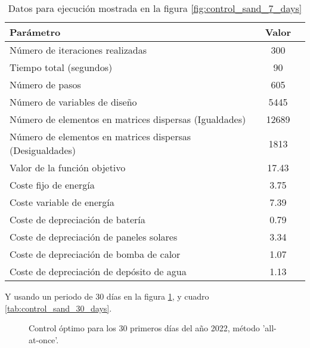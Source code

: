 \begin{table}[ht]
	\centering
	\caption{Datos para ejecución mostrada en la figura \ref{fig:control_sand_7_days}}
	\label{tab:control_sand_7_days}
	\begin{tabular}{@{}lcc@{}}
		\toprule
		Parámetro                                                 & Valor \\
		\midrule
		Número de iteraciones realizadas                          & 300   \\
		Tiempo total (segundos)                                   & 90    \\
		Número de pasos                                           & 605   \\
		Número de variables de diseño                             & 5445  \\
		Número de elementos en matrices dispersas (Igualdades)    & 12689 \\
		Número de elementos en matrices dispersas (Desigualdades) & 1813  \\
		\midrule
		Valor de la función objetivo                              & 17.43 \\
		\midrule
		Coste fijo de energía                                     & 3.75  \\
		Coste variable de energía                                 & 7.39  \\
		Coste de depreciación de batería                          & 0.79  \\
		Coste de depreciación de paneles solares                  & 3.34  \\
		Coste de depreciación de bomba de calor                   & 1.07  \\
		Coste de depreciación de depósito de agua                 & 1.13  \\
		\bottomrule
	\end{tabular}
\end{table}

Y usando un periodo de 30 días en la figura \ref{fig:control_sand_30_days}, y
cuadro \ref{tab:control_sand_30_days}.

\begin{figure}[h] \centering
	\centering
	
	\caption{Control óptimo para los 30 primeros días del año 2022, método 'all-at-once'.}
	\label{fig:control_sand_30_days}
\end{figure}


